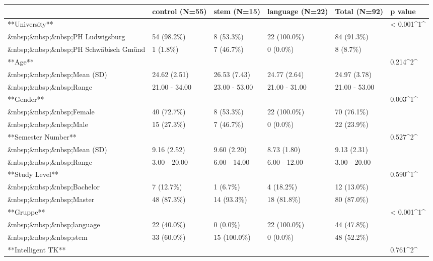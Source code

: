 \documentclass[
  letterpaper,
  DIV=11,
  numbers=noendperiod]{scrartcl}
\begin{document}
\begin{table}
{\begin{tabular}{llllll}
\toprule
 & control (N=55) & stem (N=15) & language (N=22) & Total (N=92) & p value\\
\midrule
**University** &  &  &  &  & < 0.001\textasciicircum{}1\textasciicircum{}\\
\&nbsp;\&nbsp;\&nbsp;PH Ludwigsburg & 54 (98.2\%) & 8 (53.3\%) & 22 (100.0\%) & 84 (91.3\%) & \\
\&nbsp;\&nbsp;\&nbsp;PH Schwäbisch Gmünd & 1 (1.8\%) & 7 (46.7\%) & 0 (0.0\%) & 8 (8.7\%) & \\
**Age** &  &  &  &  & 0.214\textasciicircum{}2\textasciicircum{}\\
\&nbsp;\&nbsp;\&nbsp;Mean (SD) & 24.62 (2.51) & 26.53 (7.43) & 24.77 (2.64) & 24.97 (3.78) & \\
\addlinespace
\&nbsp;\&nbsp;\&nbsp;Range & 21.00 - 34.00 & 23.00 - 53.00 & 21.00 - 31.00 & 21.00 - 53.00 & \\
**Gender** &  &  &  &  & 0.003\textasciicircum{}1\textasciicircum{}\\
\&nbsp;\&nbsp;\&nbsp;Female & 40 (72.7\%) & 8 (53.3\%) & 22 (100.0\%) & 70 (76.1\%) & \\
\&nbsp;\&nbsp;\&nbsp;Male & 15 (27.3\%) & 7 (46.7\%) & 0 (0.0\%) & 22 (23.9\%) & \\
**Semester Number** &  &  &  &  & 0.527\textasciicircum{}2\textasciicircum{}\\
\addlinespace
\&nbsp;\&nbsp;\&nbsp;Mean (SD) & 9.16 (2.52) & 9.60 (2.20) & 8.73 (1.80) & 9.13 (2.31) & \\
\&nbsp;\&nbsp;\&nbsp;Range & 3.00 - 20.00 & 6.00 - 14.00 & 6.00 - 12.00 & 3.00 - 20.00 & \\
**Study Level** &  &  &  &  & 0.590\textasciicircum{}1\textasciicircum{}\\
\&nbsp;\&nbsp;\&nbsp;Bachelor & 7 (12.7\%) & 1 (6.7\%) & 4 (18.2\%) & 12 (13.0\%) & \\
\&nbsp;\&nbsp;\&nbsp;Master & 48 (87.3\%) & 14 (93.3\%) & 18 (81.8\%) & 80 (87.0\%) & \\
\addlinespace
**Gruppe** &  &  &  &  & < 0.001\textasciicircum{}1\textasciicircum{}\\
\&nbsp;\&nbsp;\&nbsp;language & 22 (40.0\%) & 0 (0.0\%) & 22 (100.0\%) & 44 (47.8\%) & \\
\&nbsp;\&nbsp;\&nbsp;stem & 33 (60.0\%) & 15 (100.0\%) & 0 (0.0\%) & 48 (52.2\%) & \\
**Intelligent TK** &  &  &  &  & 0.761\textasciicircum{}2\textasciicircum{}\\

\end{tabular}}
\end{table}
\end{document}
